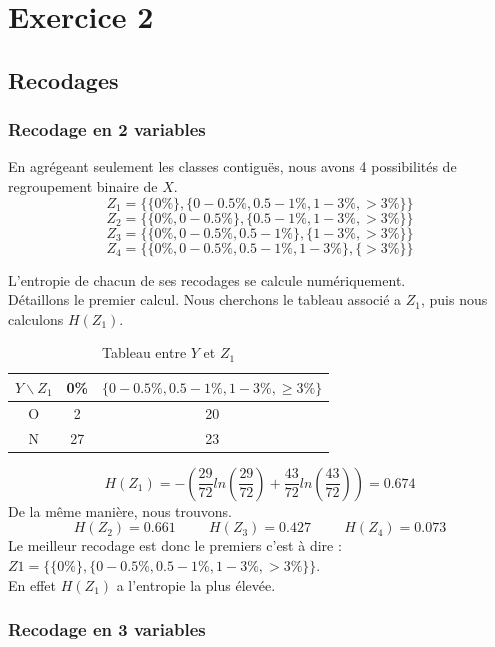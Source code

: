 \documentclass{article}
\begin{document}
\newpage
\section{Exercice 2}
\label{exercice2}
\subsection{Recodages}

\subsubsection{Recodage en 2 variables}

En agrégeant seulement les classes contiguës, nous avons 4 possibilités de regroupement binaire de 
$X$.
\\
 

\[
Z_1 =\{ \{0 \% \} , \{0 - 0.5 \% ,0.5-1 \% ,1-3 \% ,>3 \% \} \}  
\]
\[
Z_2 =\{ \{0 \% , 0 - 0.5 \%  \} , \{0.5-1 \% ,1-3 \% ,>3 \% \} \}
\]
\[
Z_3 =\{ \{0 \%, 0 - 0.5 \% ,0.5-1 \%  \} , \{1-3 \% ,>3 \% \} \}
\]
\[
Z_4 =\{ \{0 \% , 0 - 0.5 \% ,0.5-1 \% ,1-3 \% \} , \{>3 \% \} \}
\]


L'entropie de chacun de ses recodages se calcule numériquement.
\\
Détaillons le premier calcul. Nous cherchons le tableau associé a $Z_1$, puis nous calculons $H(Z_1)$.
\begin{table}[h!]
  \centering
  \caption{Tableau entre $Y$ et $Z_1$}
  \begin{tabular}{|c|c|c|}
  \hline
  $Y \backslash Z_1$ & 0\% & $\{0-0.5\%, 0.5-1\%, 1-3\%, \geq 3\%\}$ \\
  \hline
  O & 2 & 20 \\
  \hline
  N & 27 & 23 \\
  \hline
  \end{tabular}
  \end{table}

\[
H(Z_1) = -\left(\frac{29}{72}ln(\frac{29}{72})+\frac{43}{72}ln(\frac{43}{72})\right) = 0.674
\]
De la même manière, nous trouvons.
\[
H(Z_2) = 0.661 \hspace{1cm} H(Z_3) = 0.427 \hspace{1cm} H(Z_4) = 0.073
\]
Le meilleur recodage est donc le premiers c'est à dire :
$Z1 =\{ \{0 \% \} , \{0 - 0.5 \% ,0.5-1 \% ,1-3 \% ,>3 \% \} \}$.\\
En effet $H(Z_1)$ a l'entropie la plus élevée.


\subsubsection{Recodage en 3 variables}
\end{document}
